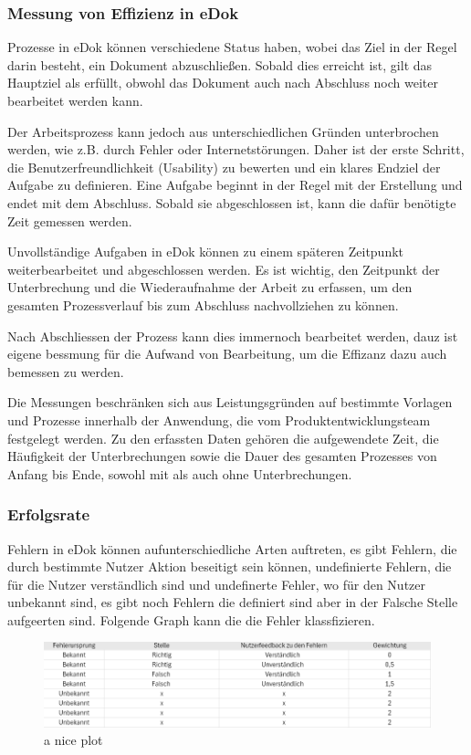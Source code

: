 \documentclass[12pt,oneside]{article}
\begin{document}
\subsubsection{Messung von Effizienz in eDok}
Prozesse in eDok können verschiedene Status haben, wobei das Ziel in der Regel darin besteht, ein Dokument abzuschließen. Sobald dies erreicht ist, gilt das Hauptziel als erfüllt, obwohl das Dokument auch nach Abschluss noch weiter bearbeitet werden kann.

Der Arbeitsprozess kann jedoch aus unterschiedlichen Gründen unterbrochen werden, wie z.B. durch Fehler oder Internetstörungen. Daher ist der erste Schritt, die Benutzerfreundlichkeit (Usability) zu bewerten und ein klares Endziel der Aufgabe zu definieren. Eine Aufgabe beginnt in der Regel mit der Erstellung und endet mit dem Abschluss. Sobald sie abgeschlossen ist, kann die dafür benötigte Zeit gemessen werden.

Unvollständige Aufgaben in eDok können zu einem späteren Zeitpunkt weiterbearbeitet und abgeschlossen werden. Es ist wichtig, den Zeitpunkt der Unterbrechung und die Wiederaufnahme der Arbeit zu erfassen, um den gesamten Prozessverlauf bis zum Abschluss nachvollziehen zu können.

Nach Abschliessen der Prozess kann dies immernoch bearbeitet werden, dauz ist eigene bessmung für die Aufwand von Bearbeitung, um die Effizanz dazu auch bemessen zu werden.

Die Messungen beschränken sich aus Leistungsgründen auf bestimmte Vorlagen und Prozesse innerhalb der Anwendung, die vom Produktentwicklungsteam festgelegt werden. Zu den erfassten Daten gehören die aufgewendete Zeit, die Häufigkeit der Unterbrechungen sowie die Dauer des gesamten Prozesses von Anfang bis Ende, sowohl mit als auch ohne Unterbrechungen.
\subsubsection{Erfolgsrate}
Fehlern in eDok können aufunterschiedliche Arten auftreten, es gibt Fehlern, die durch bestimmte Nutzer Aktion beseitigt sein können, undefinierte Fehlern, die für die Nutzer verständlich sind und undefinerte Fehler, wo für den Nutzer unbekannt sind, es gibt noch Fehlern die definiert sind aber in der Falsche Stelle aufgeerten sind. Folgende Graph kann die die Fehler klassfizieren.
\begin{figure}[h]
    \centering
    \includegraphics[width=1.00\textwidth]{FehlerMatrix.png}
    \caption{a nice plot}
    \label{fig:mesh1}
\end{figure}
\end{document}
